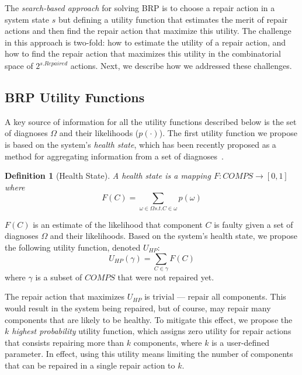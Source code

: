 \documentclass[review]{elsarticle}
\newtheorem{definition}{Definition}
\newcommand{\notrepaired}{{\overline{\textit{Repaired}}}}
\begin{document}
The \emph{search-based approach} for solving BRP is to choose a repair action in a system state $s$
but defining a utility function that estimates the merit of repair actions and then find the repair action that maximize this utility. The challenge in this approach is two-fold: how to estimate the utility of a repair action, 
and how to find the repair action that maximizes this utility in the combinatorial space of $2^{s.\notrepaired}$  actions. Next, we describe how we addressed these challenges.


\subsection{BRP Utility Functions} 

A key source of information for all the utility functions described below is the set of diagnoses $\Omega$ and their likelihoods ($p(\cdot)$). 
The first utility function we propose is based on the system's {\em health state}, which has been recently proposed as a method for aggregating information from a set of diagnoses~\cite{Stern17shelly}.

\begin{definition}[Health State]
A health state is a mapping $F: COMPS\rightarrow [0,1]$ where
\[ \displaystyle F(C)=\sum_{\omega\in \Omega s.t. C\in \omega} p(\omega)\]
\label{def:health-state}
\end{definition}
$F(C)$ is an estimate of the likelihood that component $C$ is faulty given a set of diagnoses $\Omega$ and their likelihoods.
Based on the system's health state, we propose the following utility function, denoted $U_{HP}$:
\[
U_{HP}(\gamma) = \sum_{C\in \gamma} F(C)
\]
where $\gamma$ is a subset of $COMPS$ that were not repaired yet.


The repair action that maximizes $U_{HP}$ is trivial --- repair all components.
This would result in the system being repaired, but of course, may repair many components that are likely to be healthy. To mitigate this effect, we propose the {\em $k$ highest probability} utility function, 
which assigns zero utility for repair actions
that consists repairing more than $k$ components, where $k$ is a user-defined parameter. 
In effect, using this utility means limiting the number of components that can be repaired in a single repair action to $k$. 
\end{document}
